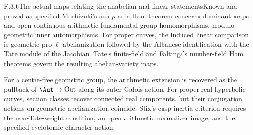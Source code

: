 \begin{result}{F.3.6}{The actual maps relating the anabelian and linear statements}{Known and proved as specified}
Mochizuki's sub-$p$-adic Hom theorem concerns dominant maps and open continuous arithmetic fundamental-group homomorphisms, modulo geometric inner automorphisms. For proper curves, the induced linear comparison is geometric pro-$\ell$ abelianization followed by the Albanese identification with the Tate module of the Jacobian. Tate's finite-field and Faltings's number-field Hom theorems govern the resulting abelian-variety maps.

For a centre-free geometric group, the arithmetic extension is recovered as the pullback of $\Aut\to\operatorname{Out}$ along its outer Galois action. For proper real hyperbolic curves, section classes recover connected real components, but their conjugation actions on geometric abelianization coincide. Stix's cusp-inertia criterion requires the non-Tate-weight condition, an open arithmetic normalizer image, and the specified cyclotomic character action.
\end{result}
